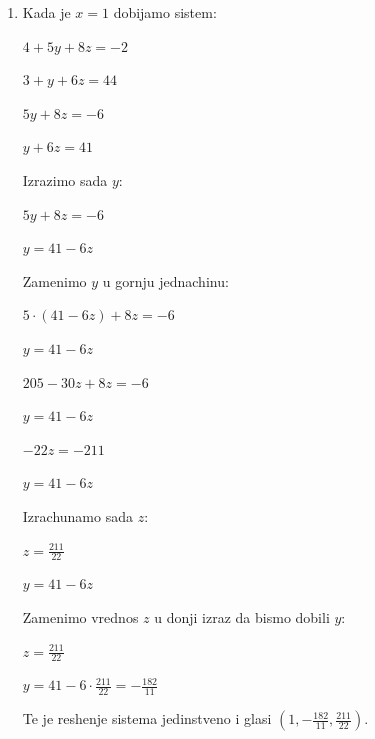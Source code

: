 \documentclass[a4paper,12pt]{article}
\begin{document}
\begin{enumerate}[1.]
\begin{enumerate}[1)]
\item Kada je $x = 1$ dobijamo sistem:
\begin{center}
\par $4 + 5y +8z = -2$
\par $3 + y + 6z = 44$
\end{center}
\begin{center}
\par $5y +8z = -6$
\par $y + 6z = 41$
\end{center}
\par Izrazimo sada $y$:
\begin{center}
\par $5y +8z = -6$
\par $y = 41 - 6z$
\end{center}
\par Zamenimo $y$ u gornju jednachinu:
\begin{center}
\par $5 \cdot (41 - 6z) +8z = -6$
\par $y = 41 - 6z$
\end{center}
\begin{center}
\par $205 -30z +8z = -6$
\par $y = 41 - 6z$
\end{center}
\begin{center}
\par $-22z = -211$
\par $y = 41 - 6z$
\end{center}
\par Izrachunamo sada $z$:
\begin{center}
\par $z = \frac{211}{22}$
\par $y = 41 - 6z$
\end{center}
\par Zamenimo vrednos $z$ u donji izraz da bismo dobili $y$:
\begin{center}
\par $z = \frac{211}{22}$
\par $y = 41 - 6 \cdot \frac{211}{22} = - \frac{182}{11}  $
\end{center}
\par Te je reshenje sistema jedinstveno i glasi $(1,-\frac{182}{11}, \frac{211}{22})$.


\end{enumerate}
\end{enumerate}
\end{document}
